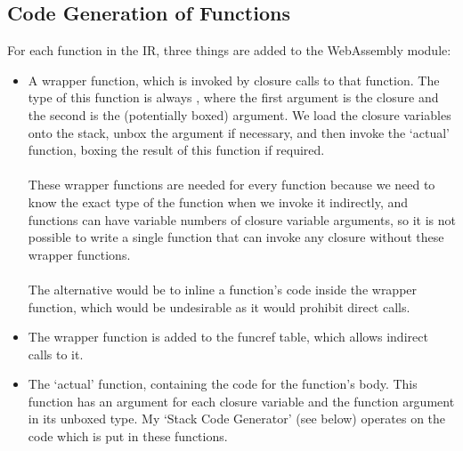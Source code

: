 \subsection{Code Generation of Functions}
For each function in the IR, three things are added to the WebAssembly module:
\begin{itemize}
\item A wrapper function, which is invoked by closure calls to that function. The type of this function is always , where the first argument is the closure and the second is the (potentially boxed) argument. We load the closure variables onto the stack, unbox the argument if necessary, and then invoke the `actual' function, boxing the result of this function if required.
\\\\
These wrapper functions are needed for every function because we need to know the exact type of the function when we invoke it indirectly, and functions can have variable numbers of closure variable arguments, so it is not possible to write a single function that can invoke any closure without these wrapper functions.
\\\\
The alternative would be to inline a function's code inside the wrapper function, which would be undesirable as it would prohibit direct calls.
\item The wrapper function is added to the funcref table, which allows indirect calls to it.
\item The `actual' function, containing the code for the function's body. This function has an argument for each closure variable and the function argument in its unboxed type. My `Stack Code Generator' (see below) operates on the code which is put in these functions.
\end{itemize}

